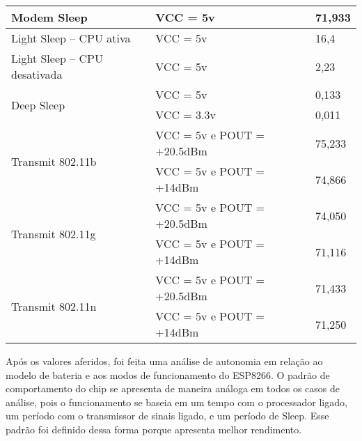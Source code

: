 \begin{table}[htp]
\begin{tabular}{|l|l|l|}
Modem Sleep                                                          & VCC = 5v                   & 71,933             \\ \hline
Light Sleep – CPU ativa                                              & VCC = 5v                   & 16,4               \\ \hline
Light Sleep – CPU desativada                                         & VCC = 5v                   & 2,23               \\ \hline
\multirow{2}{*}{Deep Sleep}                                          & VCC = 5v                   & 0,133              \\ \cline{2-3} 
                                                                     & VCC = 3.3v                 & 0,011              \\ \hline
\multirow{2}{*}{Transmit 802.11b}                                    & VCC = 5v e POUT = +20.5dBm & 75,233             \\ \cline{2-3} 
                                                                     & VCC = 5v e POUT = +14dBm   & 74,866             \\ \hline
\multirow{2}{*}{Transmit 802.11g}                                    & VCC = 5v e POUT = +20.5dBm & 74,050             \\ \cline{2-3} 
                                                                     & VCC = 5v e POUT = +14dBm   & 71,116             \\ \hline
\multirow{2}{*}{Transmit 802.11n}                                    & VCC = 5v e POUT = +20.5dBm & 71,433             \\ \cline{2-3} 
                                                                     & VCC = 5v e POUT = +14dBm   & 71,250             \\ \hline
\end{tabular}
\end{table}

{
Após os valores aferidos, foi feita uma análise de autonomia em relação ao modelo de bateria e aos modos de funcionamento do ESP8266. O padrão de comportamento do chip se apresenta de maneira análoga em todos os casos de análise, pois o funcionamento se baseia em um tempo com o processador ligado, um período com o transmissor de sinais ligado, e um período de Sleep. Esse padrão foi definido dessa forma porque apresenta melhor rendimento.
}

{

}

